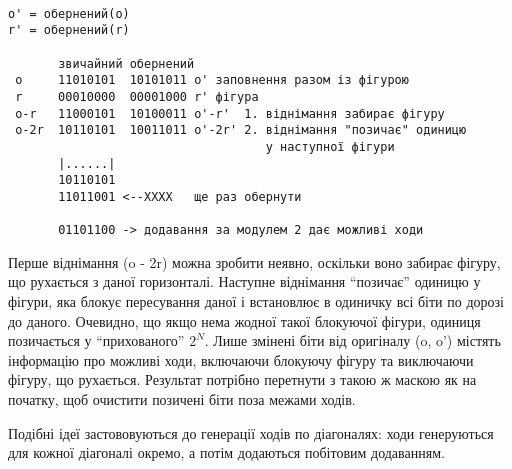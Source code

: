 \documentclass[12pt,a4paper]{article}
\begin{document}
\singlespacing
\begin{verbatim}

o' = обернений(o)
r' = обернений(r)
 
       звичайний обернений
 o     11010101  10101011 o' заповнення разом із фігурою
 r     00010000  00001000 r' фігура
 o-r   11000101  10100011 o'-r'  1. віднімання забирає фігуру
 o-2r  10110101  10011011 o'-2r' 2. віднімання "позичає" одиницю
                                    у наступної фігури
       |......|
       10110101
       11011001 <--XXXX   ще раз обернути
                          
       01101100 -> додавання за модулем 2 дає можливі ходи

\end{verbatim}

\fontsize{14pt}{6mm}\selectfont

Перше віднімання (o - 2r) можна зробити неявно, оскільки воно забирає фігуру,
що рухається з даної горизонталі. Наступне віднімання ``позичає'' одиницю у
фігури, яка блокує пересування даної і встановлює в одиничку всі біти по
дорозі до даного. Очевидно, що якщо нема жодної такої блокуючої фігури,
одиниця позичається у ``прихованого'' $2^N$. Лише змінені біти від оригіналу
(o, o') містять інформацію про можливі ходи, включаючи блокуючу фігуру та
виключаючи фігуру, що рухається. Результат потрібно перетнути з такою ж маскою
як на початку, щоб очистити позичені біти поза межами ходів.

Подібні ідеї застововуються до генерації ходів по діагоналях: ходи генеруються
для кожної діагоналі окремо, а потім додаються побітовим додаванням.
\end{document}
